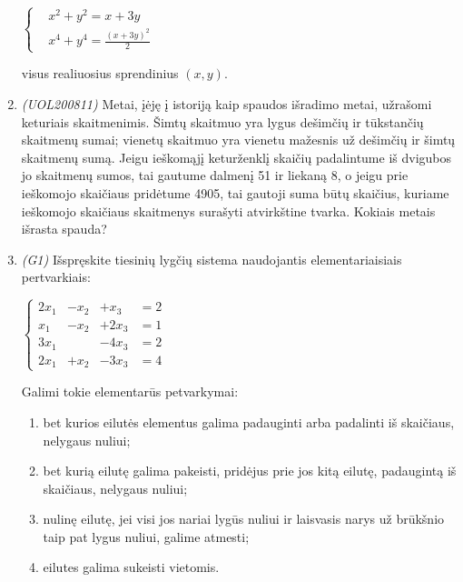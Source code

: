 \documentclass[a4paper]{article}
\begin{document}
\begin{enumerate}
            $\left\{\begin{aligned}
                         & x^2+y^2 = x+3y                 \\
                         & x^4 + y^4 = \frac{(x+3y)^2}{2}
                  \end{aligned}\right.$

            visus realiuosius sprendinius $(x, y)$.

      \item \textit{(UOL200811)} Metai, įėję į istoriją kaip spaudos išradimo metai, užrašomi keturiais
            skaitmenimis. Šimtų skaitmuo yra lygus dešimčių ir tūkstančių skaitmenų sumai;
            vienetų skaitmuo yra vienetu mažesnis už dešimčių ir šimtų skaitmenų sumą.
            Jeigu ieškomąjį keturženklį skaičių padalintume iš dvigubos jo skaitmenų sumos,
            tai gautume dalmenį 51 ir liekaną 8, o jeigu prie ieškomojo skaičiaus pridėtume
            4905, tai gautoji suma būtų skaičius, kuriame ieškomojo skaičiaus skaitmenys
            surašyti atvirkštine tvarka. Kokiais metais išrasta spauda?

      \item \textit{(G1)} Išspręskite tiesinių lygčių sistema naudojantis elementariaisiais pertvarkiais:

            $\left\{\begin{aligned}
                        2x_1 & -x_2 & +x_3  & = 2 \\
                        x_1  & -x_2 & +2x_3 & = 1 \\
                        3x_1 &      & -4x_3 & =2  \\
                        2x_1 & +x_2 & -3x_3 & =4
                  \end{aligned}\right.$

            Galimi tokie elementarūs petvarkymai:

            \begin{enumerate}
                  \item bet kurios eilutės elementus galima padauginti arba padalinti iš skaičiaus,
                        nelygaus nuliui;
                  \item bet kurią eilutę galima pakeisti, pridėjus prie jos kitą eilutę, padaugintą iš
                        skaičiaus, nelygaus nuliui;
                  \item nulinę eilutę, jei visi jos nariai lygūs nuliui ir laisvasis narys už brūkšnio
                        taip pat lygus nuliui, galime atmesti;
                  \item eilutes galima sukeisti vietomis.
            \end{enumerate}


\end{enumerate}
\end{document}
